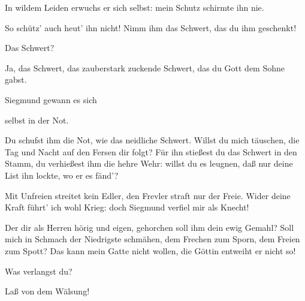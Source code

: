 \begin{drama}

In wildem Leiden erwuchs er sich selbst:
mein Schutz schirmte ihn nie.
 

\Frickaspeaks
So schütz' auch heut' ihn nicht!
Nimm ihm das Schwert, das du ihm geschenkt!
 

\Wotanspeaks
Das Schwert?
 

\Frickaspeaks
Ja, das Schwert,
das zauberstark zuckende Schwert,
das du Gott dem Sohne gabst.
 

\Wotanspeaks


Siegmund gewann es sich


selbst in der Not.
 




\Frickaspeaks


Du schufst ihm die Not,
wie das neidliche Schwert.
Willst du mich täuschen,
die Tag und Nacht auf den Fersen dir folgt?
Für ihn stießest du das Schwert in den Stamm,
du verhießest ihm die hehre Wehr:
willst du es leugnen,
daß nur deine List
ihn lockte, wo er es fänd'?
 




\Frickaspeaks


Mit Unfreien streitet kein Edler,
den Frevler straft nur der Freie.
Wider deine Kraft
führt' ich wohl Krieg:
doch Siegmund verfiel mir als Knecht!
 



Der dir als Herren hörig und eigen,
gehorchen soll ihm dein ewig Gemahl?
Soll mich in Schmach der Niedrigste schmähen,
dem Frechen zum Sporn,
dem Freien zum Spott?
Das kann mein Gatte nicht wollen,
die Göttin entweiht er nicht so!
 

\Wotanspeaks


Was verlangst du?
 

\Frickaspeaks
Laß von dem Wälsung!
 


\end{drama}
